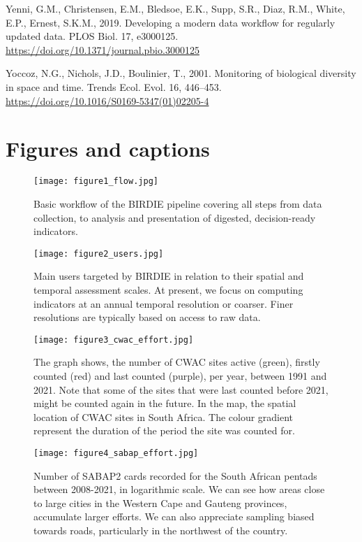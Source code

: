 \documentclass[utf8]{frontiersSCNS}
\begin{document}
Yenni, G.M., Christensen, E.M., Bledsoe, E.K., Supp, S.R., Diaz, R.M.,
White, E.P., Ernest, S.K.M., 2019. Developing a modern data workflow for
regularly updated data. PLOS Biol. 17, e3000125.
\url{https://doi.org/10.1371/journal.pbio.3000125}

Yoccoz, N.G., Nichols, J.D., Boulinier, T., 2001. Monitoring of
biological diversity in space and time. Trends Ecol. Evol. 16, 446--453.
\url{https://doi.org/10.1016/S0169-5347(01)02205-4}

\hypertarget{figures-and-captions}{%
\section*{Figures and captions}\label{figures-and-captions}}

\begin{figure}[!h]
\centering
  \texttt{[image: figure1\_flow.jpg]}
  \caption{Basic workflow of the BIRDIE pipeline covering all steps from data collection, to analysis and presentation of digested, decision-ready indicators.}
\end{figure}

\begin{figure}[!h]
\centering
  \texttt{[image: figure2\_users.jpg]}
  \caption{Main users targeted by BIRDIE in relation to their spatial and temporal assessment scales. At present, we focus on computing indicators at an annual temporal resolution or coarser. Finer resolutions are typically based on access to raw data.}
\end{figure}

\begin{figure}[!h]
\centering
  \texttt{[image: figure3\_cwac\_effort.jpg]}
  \caption{The graph shows, the number of CWAC sites active (green), firstly counted (red) and last counted (purple), per year, between 1991 and 2021. Note that some of the sites that were last counted before 2021, might be counted again in the future. In the map, the spatial location of CWAC sites in South Africa. The colour gradient represent the duration of the period the site was counted for.}
\end{figure}

\begin{figure}[!h]
\centering
  \texttt{[image: figure4\_sabap\_effort.jpg]}
  \caption{Number of SABAP2 cards recorded for the South African pentads between 2008-2021, in logarithmic scale. We can see how areas close to large cities in the Western Cape and Gauteng provinces, accumulate larger efforts. We can also appreciate sampling biased towards roads, particularly in the northwest of the country.}
\end{figure}
\end{document}
